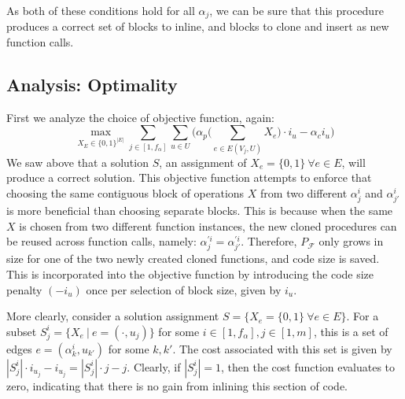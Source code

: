 \documentclass[12pt,twoside]{article}
\begin{document}
	As both of these conditions hold for all $\alpha_j$, we can be sure that this procedure produces a correct set of blocks to inline, and blocks to clone and insert as new function calls. 

\subsection{Analysis: Optimality}
First we analyze the choice of objective function, again:
	\begin{equation}
		\max_{X_E \in \{0,1\}^{|E|}} \sum_{j \in [1,f_{\alpha}]}  \sum_{u \in U}\bigg(\alpha_p\Big(\sum_{e \in E(V_j,U)} X_e\Big) \cdot i_u - \alpha_ci_u\bigg) 
	\end{equation}
	We saw above that a solution $S$, an assignment of $X_e = \{0,1\}\ \forall e\in E$, will produce a correct solution. This objective function attempts to enforce that choosing the same contiguous block of operations $X$ from two different $\alpha_j^i$ and $\alpha_{j'}^i$ is more beneficial than choosing separate blocks. This is because when the same $X$ is chosen from two different function instances, the new cloned procedures can be reused across function calls, namely: $\alpha_j^{'i} = \alpha_{j'}^{'i}$. Therefore, $P_{\mathcal{F}}$ only grows in size for one of the two newly created cloned functions, and code size is saved. This is incorporated into the objective function by introducing the code size penalty $(-i_u)$ once per selection of block size, given by $i_u$. 

	More clearly, consider a solution assignment $S = \{X_e = \{0,1\}\ \forall e \in E\}$. For a subset $S_j^i = \{X_e\ |\ e = (\cdot, u_j)\}$ for some $i \in [1,f_{\alpha}],j \in [1,m]$, this is a set of edges $e = (\alpha_k^i, u_{k'})$ for some $k,k'$. The cost associated with this set is given by $|S_j^i| \cdot i_{u_j} - i_{u_j} = |S_j^i| \cdot j - j$. Clearly, if $|S_j^i| = 1$, then the cost function evaluates to zero, indicating that there is no gain from inlining this section of code. 
\end{document}
